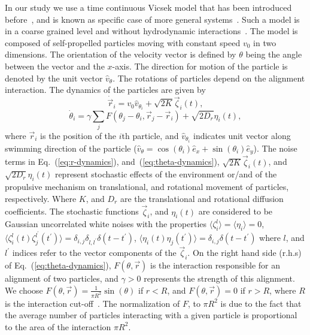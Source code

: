\documentclass[reprint,floatfix,amsmath,amssymb,aps,pre,showkeys,showpacs,superscriptaddress]{revtex4-1}
\newcommand{\ave}[1]{\langle #1 \rangle}
\newcommand{\req}[1]{Eq.~(\ref{#1})}
\newcommand{\reqs}[2]{Eq.~(\ref{#1}), and~(\ref{#2})}
\begin{document}
In our study we use a time continuous Vicsek model that has been introduced before~\cite{peruani2008mean}, and is known as specific case of more general systems~\cite{Farrell2012,Yang2015,Morin2015}. Such a model is in a coarse grained level and without hydrodynamic interactions~\cite{Hernandez-Ortiz2005transport,Underhill2008diffusion}. The model is composed of self-propelled particles moving with constant speed $v_0$ in two dimensions. The orientation of the velocity vector is defined by $\theta$ being the angle between the vector and the $x$-axis.  The direction for motion of the particle is denoted by the unit vector $\hat{v}_\theta$. The rotations of particles depend on the alignment interaction. The dynamics of the particles are given by
\begin{equation}
\dot{\vec{r}}_i = v_0 \hat{v}_{\theta_i} + \sqrt{2K} \vec{\zeta}_i(t),
\label{eq:r-dynamics}
\end{equation}
\begin{equation}
\dot{\theta}_i = \gamma \sum_j F(\theta_j - \theta_i, \vec{r}_j - \vec{r}_i) + \sqrt{2 D_r} \eta_{i}(t),
\label{eq:theta-dynamics}
\end{equation}
where $\vec{r}_i$ is the position of the $i$th particle, and $\hat{v}_{\theta_i}$ indicates unit vector along swimming direction of the particle ($\hat{v}_{\theta} = \cos(\theta_i) \hat{e}_x + \sin(\theta_i) \hat{e}_y$). The noise terms in \reqs{eq:r-dynamics}{eq:theta-dynamics}, $\sqrt{2K} \vec{\zeta}_i(t)$,  and $\sqrt{2 D_r} \eta_{i}(t)$ represent stochastic effects of the environment or/and  of the propulsive mechanism on translational, and rotational movement of particles, respectively. Where $K$, and $D_r$ are the translational and rotational diffusion coefficients. The stochastic functions $\vec{\zeta}_i$, and $\eta_{i}(t)$ are considered to be Gaussian uncorrelated white noises with the properties $\ave{\zeta_i^l} = \ave{\eta_i} = 0$, $\ave{\zeta_i^l(t) \zeta_j^{l^\prime}(t^\prime)} = \delta_{i,j} \delta_{l,l^\prime} \delta(t - t^\prime)$, $\ave{\eta_i(t) \eta_j(t^\prime)} = \delta_{i,j} \delta(t - t^\prime)$ where $l$, and $l^\prime$ indices refer to the vector components of the $\vec{\zeta}_i$. On the right hand side (r.h.s) of \req{eq:theta-dynamics}, $F(\theta,\vec{r})$ is the interaction responsible for an alignment of two particles, and $\gamma > 0$ represents the strength of this alignment. We choose $F(\theta,\vec{r}) = \frac{1}{\pi R^2} \sin \left( \theta \right)$ if $r<R$, and $F(\theta,\vec{r}) = 0$ if $r>R$, where $R$ is the interaction cut-off~\cite{Farrell2012}. The normalization of $F$, to $\pi R^2$ is due to the fact that the average number of particles interacting with a given particle is proportional to the area of the interaction $\pi R^2$.
\end{document}
